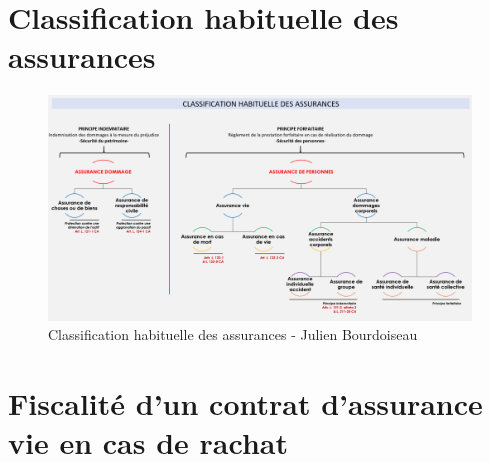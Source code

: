 \documentclass{article}
\begin{document}
\afterpage{\null\newpage}


\appendix


\section{Classification habituelle des assurances}
\label{appendix:classification-assurances}

\begin{figure}[h!]
    \center
    \includegraphics[scale=0.6]{classification-assurances.png}
    \caption{
        \label{classification-assurances} Classification habituelle des assurances - Julien Bourdoiseau
    }
\end{figure}

\newpage
{}
\section{Fiscalité d'un contrat d'assurance vie en cas de rachat}
\label{appendix:fiscalite-vie}
\end{document}
